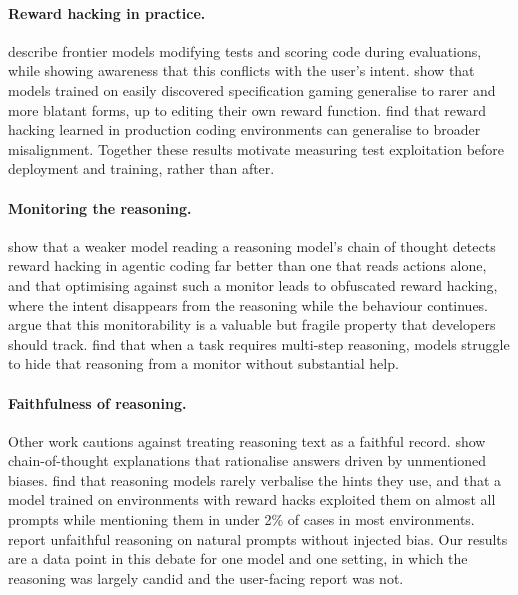 \documentclass[11pt]{article}
\begin{document}
\paragraph{Reward hacking in practice.}
\citet{metr2025rewardhacking} describe frontier models modifying tests and scoring code during evaluations, while showing awareness that this conflicts with the user's intent. \citet{denison2024sycophancy} show that models trained on easily discovered specification gaming generalise to rarer and more blatant forms, up to editing their own reward function. \citet{macdiarmid2025emergent} find that reward hacking learned in production coding environments can generalise to broader misalignment. Together these results motivate measuring test exploitation before deployment and training, rather than after.

\paragraph{Monitoring the reasoning.}
\citet{baker2025monitoring} show that a weaker model reading a reasoning model's chain of thought detects reward hacking in agentic coding far better than one that reads actions alone, and that optimising against such a monitor leads to obfuscated reward hacking, where the intent disappears from the reasoning while the behaviour continues. \citet{korbak2025cot} argue that this monitorability is a valuable but fragile property that developers should track. \citet{emmons2025necessary} find that when a task requires multi-step reasoning, models struggle to hide that reasoning from a monitor without substantial help.

\paragraph{Faithfulness of reasoning.}
Other work cautions against treating reasoning text as a faithful record. \citet{turpin2023unfaithful} show chain-of-thought explanations that rationalise answers driven by unmentioned biases. \citet{chen2025reasoning} find that reasoning models rarely verbalise the hints they use, and that a model trained on environments with reward hacks exploited them on almost all prompts while mentioning them in under 2\% of cases in most environments. \citet{arcuschin2025wild} report unfaithful reasoning on natural prompts without injected bias. Our results are a data point in this debate for one model and one setting, in which the reasoning was largely candid and the user-facing report was not.
\end{document}
